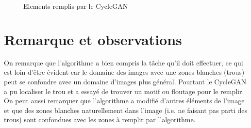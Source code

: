 \begin{figure}[H]
    \centering
    \qquad
    \caption{Elements remplis par le CycleGAN}%
    \label{fig:example}%
\end{figure}

\section{Remarque et observations}
On remarque que l'algorithme a bien compris la tâche qu'il doit effectuer, ce qui est loin d'être évident car le domaine des images avec une zones blanches (trous) peut se confondre avec un domaine d'images plus général. Pourtant le CycleGAN a pu localiser le trou et a essayé de trouver un motif ou floutage pour le remplir.
On peut aussi remarquer que l'algorithme a modifié d'autres éléments de l'image et que des zones blanches naturellement dans l'image (i.e. ne faisant pas parti des trous) sont confondues avec les zones à remplir par l'algorithme.

